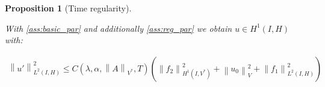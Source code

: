 \documentclass[english,a4paper,10pt,oneside]{scrbook}	%
\theoremstyle{break}
\newtheorem{thm}[equation]{Theorem}
\newtheorem{prop}[equation]{Proposition}
\newenvironment{mproof}[1][\proofname]{%
  \begin{proof}[#1]$ $\par\nobreak\ignorespaces
}{%
  \end{proof}
}
\renewcommand*{\proofname}{Proof}
\theoremstyle{remark}
\newcommand{\norm}[1]{\left\lVert#1\right\rVert}
\newcommand{\HN}[1]{\norm{#1}_{H}}
\newcommand{\VN}[1]{\norm{#1}_{V}}
\newcommand{\VSN}[1]{\norm{#1}_{V^*}}
\begin{document}
\begin{appendices}
%
%
%
%
%
%
%

\begin{prop}[Time regularity]
\label{thm:const_track}

With \cref{ass:basic_par} and  additionally \cref{ass:reg_par} we obtain $u \in H^1(I,H)$ with:

\begin{align*}
\norm{u'}^2_{L^2(I,H)}\leq  C(\lambda, \alpha, \VSN{A}, T)(\norm{f_2}_{H^1(I,V^*)}^2+\VN{u_{0}}^2+\norm{f_1}_{L^2(I,H)}^2)
\end{align*}


\end{prop}
\end{appendices}
\end{document}
